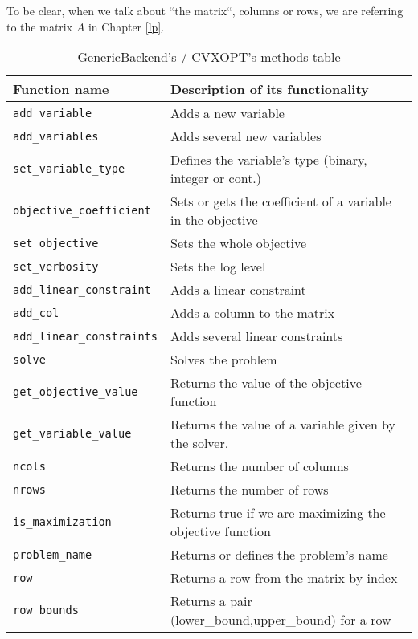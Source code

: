  To be clear, when we talk about ``the matrix``, columns or rows, we are referring to the matrix $A$ in Chapter \ref{lp}.

\begin{table}
    \caption{GenericBackend's / CVXOPT's methods table}
\label{table:generic}

\begin{center}
  \begin{tabular}{ | l |  l |}
    \hline
Function name& Description of its functionality\\
    \hline    
\texttt{add\_variable}&              Adds a new variable \\ 
\texttt{add\_variables}&             Adds several new variables \\ 
\texttt{set\_variable\_type}&        Defines the variable's type (binary, integer or cont.) \\ 
\texttt{objective\_coefficient}&     Sets or gets the coefficient of a variable in the objective\\
\texttt{set\_objective}&             Sets the whole objective\\  
\texttt{set\_verbosity}&             Sets the log level\\
\texttt{add\_linear\_constraint}&    Adds a linear constraint \\
\texttt{add\_col}&                   Adds a column to the matrix \\  
\texttt{add\_linear\_constraints}&   Adds several linear constraints \\ 
\texttt{solve}&      			     Solves the problem \\
\texttt{get\_objective\_value}&      Returns the value of the objective function \\ 
\texttt{get\_variable\_value}&       Returns the value of a variable given by the solver.  \\ 
\texttt{ncols}&                      Returns the number of columns  \\ 
\texttt{nrows}&                      Returns the number of rows \\ 
\texttt{is\_maximization}&           Returns true if we are maximizing the objective function \\ 
\texttt{problem\_name}&              Returns or defines the problem's name\\ 
\texttt{row}&                        Returns a row from the matrix by index\\ 
\texttt{row\_bounds}&                Returns a pair (lower\_bound,upper\_bound) for a row\\ 

\end{tabular}
\end{center}
\end{table}
